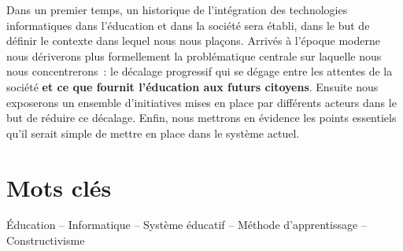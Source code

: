 Dans un premier temps, un historique de l'intégration des technologies informatiques dans l'éducation et dans la société sera établi, dans le but de définir le contexte dans lequel nous nous plaçons. Arrivés à l'époque moderne nous dériverons plus formellement la problématique centrale sur laquelle nous nous concentrerons~: le décalage progressif qui se dégage entre les attentes de la société \textbf{et ce que fournit l'éducation aux futurs citoyens}. Ensuite nous exposerons un ensemble d'initiatives mises en place par différents acteurs dans le but de réduire ce décalage. Enfin, nous mettrons en évidence les points essentiels qu'il serait simple de mettre en place dans le système actuel.

\vfill
\section*{Mots clés}
Éducation -- Informatique -- Système éducatif -- Méthode d'apprentissage -- Constructivisme